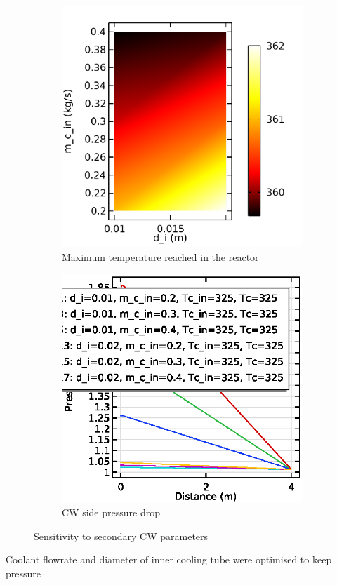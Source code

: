 \begin{figure}[h]
    \centering

    \begin{subfigure}{0.49\linewidth}
        \includegraphics[width=\linewidth]{figures/S2-maxT.png}
        \caption{Maximum temperature reached in the reactor}
        \label{fig:comsol-S2:maxT}
    \end{subfigure}
    \begin{subfigure}{0.49\linewidth}
        \includegraphics[width=\linewidth]{figures/S2-CW-Pdrop.eps}
        \caption{CW side pressure drop}
        \label{fig:comsol-S2:CW-Pdrop}
    \end{subfigure}

    \caption{Sensitivity to secondary CW parameters}
    \label{fig:comsol-S2}
\end{figure}
Coolant flowrate and diameter of inner cooling tube were optimised to keep pressure

